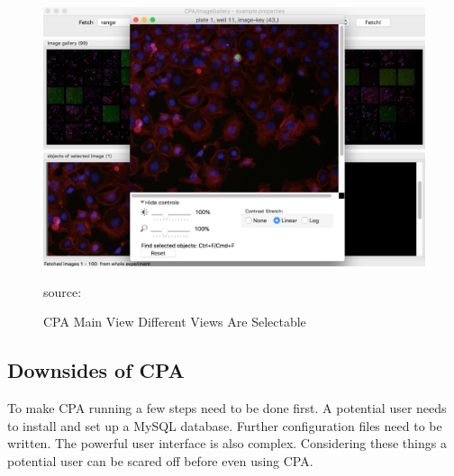 \begin{figure}[H]
	\centering
	\includegraphics[width=0.7\linewidth]{bilder/related_work/visualization.png}
	\caption{CPA Main View Different Views Are Selectable} source:\cite{ReactLogo}
	\label{fig:RL}
\end{figure}


\subsection{Downsides of CPA}
To make CPA running a few steps need to be done first. 
A potential user needs to install and set up a MySQL database.
Further configuration files need to be written. The powerful user interface is also complex. Considering these things a potential user can be scared off before even using CPA. 






